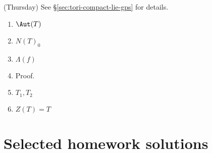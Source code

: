 \documentclass[reqno]{amsart} 
\begin{document}
(Thursday)
See \S\ref{sec:tori-compact-lie-gps} for details.
\begin{enumerate}
\item \(\Aut(T)\)
\item \(N(T)_0\)
\item \(\Lambda(f)\)
\item Proof.
\item \(T_1, T_2\)
\item \(Z(T) = T\)
\end{enumerate}



\newpage

\section{Selected homework solutions}
\label{sec:org814ace2}
\end{document}
